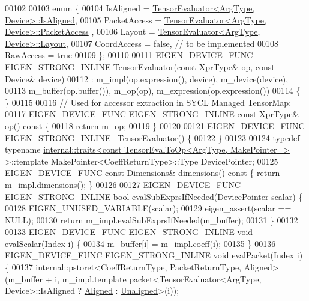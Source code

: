 \begin{DoxyCode}
00102 
00103   \textcolor{keyword}{enum} \{
00104     IsAligned = \hyperlink{struct_eigen_1_1_tensor_evaluator}{TensorEvaluator<ArgType, Device>::IsAligned},
00105     PacketAccess = \hyperlink{struct_eigen_1_1_tensor_evaluator}{TensorEvaluator<ArgType, Device>::PacketAccess}
      ,
00106     Layout = \hyperlink{struct_eigen_1_1_tensor_evaluator}{TensorEvaluator<ArgType, Device>::Layout},
00107     CoordAccess = \textcolor{keyword}{false},  \textcolor{comment}{// to be implemented}
00108     RawAccess = \textcolor{keyword}{true}
00109   \};
00110 
00111   EIGEN\_DEVICE\_FUNC EIGEN\_STRONG\_INLINE \hyperlink{struct_eigen_1_1_tensor_evaluator}{TensorEvaluator}(\textcolor{keyword}{const} XprType& op, \textcolor{keyword}{const} Device& 
      device)
00112       : m\_impl(op.expression(), device), m\_device(device),
00113           m\_buffer(op.buffer()), m\_op(op), m\_expression(op.expression())
00114   \{ \}
00115 
00116   \textcolor{comment}{// Used for accessor extraction in SYCL Managed TensorMap:}
00117   EIGEN\_DEVICE\_FUNC EIGEN\_STRONG\_INLINE \textcolor{keyword}{const} XprType& op()\textcolor{keyword}{ const }\{
00118     \textcolor{keywordflow}{return} m\_op;
00119   \}
00120   
00121   EIGEN\_DEVICE\_FUNC EIGEN\_STRONG\_INLINE ~TensorEvaluator() \{
00122   \}
00123 
00124   \textcolor{keyword}{typedef} \textcolor{keyword}{typename} \hyperlink{struct_eigen_1_1internal_1_1traits}{internal::traits<const TensorEvalToOp<ArgType, MakePointer\_>}
       >::template MakePointer<CoeffReturnType>::Type DevicePointer;
00125   EIGEN\_DEVICE\_FUNC \textcolor{keyword}{const} Dimensions& dimensions()\textcolor{keyword}{ const }\{ \textcolor{keywordflow}{return} m\_impl.dimensions(); \}
00126 
00127   EIGEN\_DEVICE\_FUNC EIGEN\_STRONG\_INLINE \textcolor{keywordtype}{bool} evalSubExprsIfNeeded(DevicePointer scalar) \{
00128     EIGEN\_UNUSED\_VARIABLE(scalar);
00129     eigen\_assert(scalar == NULL);
00130     \textcolor{keywordflow}{return} m\_impl.evalSubExprsIfNeeded(m\_buffer);
00131   \}
00132 
00133   EIGEN\_DEVICE\_FUNC EIGEN\_STRONG\_INLINE \textcolor{keywordtype}{void} evalScalar(Index i) \{
00134     m\_buffer[i] = m\_impl.coeff(i);
00135   \}
00136   EIGEN\_DEVICE\_FUNC EIGEN\_STRONG\_INLINE \textcolor{keywordtype}{void} evalPacket(Index i) \{
00137     internal::pstoret<CoeffReturnType, PacketReturnType, Aligned>(m\_buffer + i, m\_impl.template 
      packet<TensorEvaluator<ArgType, Device>::IsAligned ? \hyperlink{group__enums_gga45fe06e29902b7a2773de05ba27b47a1ad37d4c71425bb286e9b4103830538fbf}{Aligned} : \hyperlink{group__enums_gga45fe06e29902b7a2773de05ba27b47a1ac935220b4c844108e183ebe30a4d5204}{Unaligned}>(i));

\end{DoxyCode}
